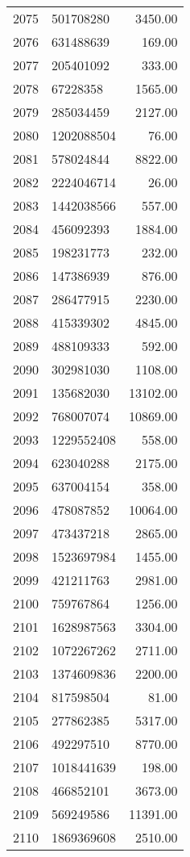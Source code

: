 \begin{table}[ht]
\begin{tabular}{rlr}
  2075 & 501708280 & 3450.00 \\ 
  2076 & 631488639 & 169.00 \\ 
  2077 & 205401092 & 333.00 \\ 
  2078 & 67228358 & 1565.00 \\ 
  2079 & 285034459 & 2127.00 \\ 
  2080 & 1202088504 & 76.00 \\ 
  2081 & 578024844 & 8822.00 \\ 
  2082 & 2224046714 & 26.00 \\ 
  2083 & 1442038566 & 557.00 \\ 
  2084 & 456092393 & 1884.00 \\ 
  2085 & 198231773 & 232.00 \\ 
  2086 & 147386939 & 876.00 \\ 
  2087 & 286477915 & 2230.00 \\ 
  2088 & 415339302 & 4845.00 \\ 
  2089 & 488109333 & 592.00 \\ 
  2090 & 302981030 & 1108.00 \\ 
  2091 & 135682030 & 13102.00 \\ 
  2092 & 768007074 & 10869.00 \\ 
  2093 & 1229552408 & 558.00 \\ 
  2094 & 623040288 & 2175.00 \\ 
  2095 & 637004154 & 358.00 \\ 
  2096 & 478087852 & 10064.00 \\ 
  2097 & 473437218 & 2865.00 \\ 
  2098 & 1523697984 & 1455.00 \\ 
  2099 & 421211763 & 2981.00 \\ 
  2100 & 759767864 & 1256.00 \\ 
  2101 & 1628987563 & 3304.00 \\ 
  2102 & 1072267262 & 2711.00 \\ 
  2103 & 1374609836 & 2200.00 \\ 
  2104 & 817598504 & 81.00 \\ 
  2105 & 277862385 & 5317.00 \\ 
  2106 & 492297510 & 8770.00 \\ 
  2107 & 1018441639 & 198.00 \\ 
  2108 & 466852101 & 3673.00 \\ 
  2109 & 569249586 & 11391.00 \\ 
  2110 & 1869369608 & 2510.00 \\ 

\end{tabular}
\end{table}
